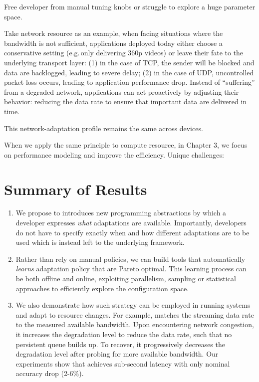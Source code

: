 \documentclass[thesis.tex]{subfiles}
\begin{document}
 Free developer from manual tuning
knobs or struggle to explore a huge parameter space.

Take network resource as an example, when facing situations where the bandwidth
is not sufficient, applications deployed today either choose a conservative
setting (e.g.\,only delivering 360p videos) or leave their fate to the
underlying transport layer: (1) in the case of TCP, the sender will be blocked
and data are backlogged, leading to severe delay; (2) in the case of UDP,
uncontrolled packet loss occurs, leading to application performance
drop. Instead of ``suffering'' from a degraded network, applications can act
proactively by adjusting their behavior: reducing the data rate to ensure that
important data are delivered in time.

This network-adaptation profile remains the same across devices.

When we apply the same principle to compute resource, in Chapter 3, we focus on
performance modeling and improve the efficiency. Unique challenges:

\section{Summary of Results}
\label{sec:summary-results-1}

\begin{enumerate}
\item We propose to introduces new programming abstractions by which a developer
  expresses \emph{what} adaptations are available. Importantly, developers do
  not have to specify exactly when and how different adaptations are to be used
  which is instead left to the underlying framework.

\item Rather than rely on manual policies, we can build tools that automatically
  \emph{learns} adaptation policy that are Pareto optimal. This learning process
  can be both offline and online, exploiting parallelism, sampling or
  statistical approaches to efficiently explore the configuration space.

\item We also demonstrate how such strategy can be employed in running systems
  and adapt to resource changes. For example, \sysname{} matches the streaming
  data rate to the measured available bandwidth. Upon encountering network
  congestion, it increases the degradation level to reduce the data rate, such
  that no persistent queue builds up. To recover, it progressively decreases the
  degradation level after probing for more available bandwidth. Our experiments
  show that \sysname{} achieves sub-second latency with only nominal accuracy
  drop (2-6\%).
\end{enumerate}
\end{document}
